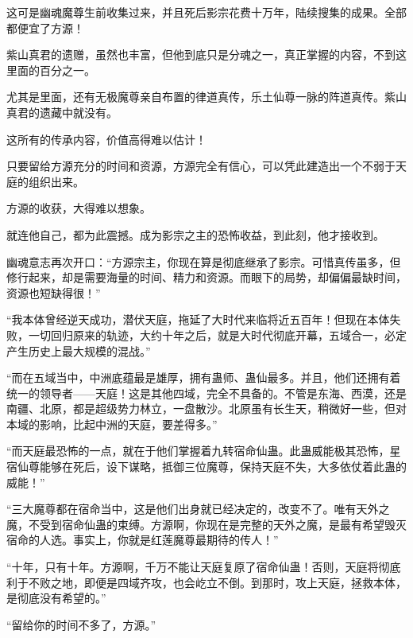 \begin{this_body}
这可是幽魂魔尊生前收集过来，并且死后影宗花费十万年，陆续搜集的成果。全部都便宜了方源！

紫山真君的遗赠，虽然也丰富，但他到底只是分魂之一，真正掌握的内容，不到这里面的百分之一。

尤其是里面，还有无极魔尊亲自布置的律道真传，乐土仙尊一脉的阵道真传。紫山真君的遗藏中就没有。

这所有的传承内容，价值高得难以估计！

只要留给方源充分的时间和资源，方源完全有信心，可以凭此建造出一个不弱于天庭的组织出来。

方源的收获，大得难以想象。

就连他自己，都为此震撼。成为影宗之主的恐怖收益，到此刻，他才接收到。

幽魂意志再次开口：“方源宗主，你现在算是彻底继承了影宗。可惜真传虽多，但修行起来，却是需要海量的时间、精力和资源。而眼下的局势，却偏偏最缺时间，资源也短缺得很！”

“我本体曾经逆天成功，潜伏天庭，拖延了大时代来临将近五百年！但现在本体失败，一切回归原来的轨迹，大约十年之后，就是大时代彻底开幕，五域合一，必定产生历史上最大规模的混战。”

“而在五域当中，中洲底蕴最是雄厚，拥有蛊师、蛊仙最多。并且，他们还拥有着统一的领导者——天庭！这是其他四域，完全不具备的。不管是东海、西漠，还是南疆、北原，都是超级势力林立，一盘散沙。北原虽有长生天，稍微好一些，但对本域的影响，比起中洲的天庭，要差得多。”

“而天庭最恐怖的一点，就在于他们掌握着九转宿命仙蛊。此蛊威能极其恐怖，星宿仙尊能够在死后，设下谋略，抵御三位魔尊，保持天庭不失，大多依仗着此蛊的威能！”

“三大魔尊都在宿命当中，这是他们出身就已经决定的，改变不了。唯有天外之魔，不受到宿命仙蛊的束缚。方源啊，你现在是完整的天外之魔，是最有希望毁灭宿命的人选。事实上，你就是红莲魔尊最期待的传人！”

“十年，只有十年。方源啊，千万不能让天庭复原了宿命仙蛊！否则，天庭将彻底利于不败之地，即便是四域齐攻，也会屹立不倒。到那时，攻上天庭，拯救本体，是彻底没有希望的。”

“留给你的时间不多了，方源。”

\end{this_body}

